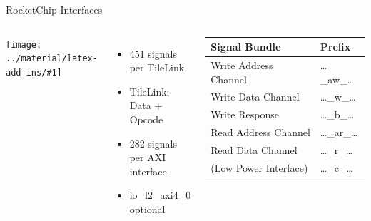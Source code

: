 \documentclass[]{beamer} %
\newcommand*{\COMPILEIMAGES}{}%
\newcommand\inputimage[1]{%
	\ifdefined\COMPILEIMAGES
		
	\else
		\texttt{[image: ../material/latex-add-ins/\#1]}
	\fi
	}
\newenvironment{fullpage}[0]{%
	\begin{list}{}{%
		\setlength{\leftmargin}{-7mm}%
		\setlength{\rightmargin}{-7mm}%
		\vspace*{-10pt}
		}%
\item[]}{\end{list}}
\begin{document}
\begin{frame}{RocketChip Interfaces}
	\begin{fullpage}
		\small
		\begin{columns}
			\inputimage{image2}
			\pause
			\begin{itemize}
				\item 451 signals per TileLink
				\item TileLink: Data + Opcode
				\item 282 signals per AXI interface
				\item io\_l2\_axi4\_0 optional
			\end{itemize}
			\vspace{5mm}
			\begin{tabular}{l|l}
				Signal Bundle & Prefix\\
				\hline
				Write Address Channel & \ldots\_aw\_\ldots \\
				Write Data Channel & \ldots\_w\_\ldots \\
				Write Response & \ldots\_b\_\ldots \\
				Read Address Channel & \ldots\_ar\_\ldots \\
				Read Data Channel & \ldots\_r\_\ldots \\
				(Low Power Interface) & \ldots\_c\_\ldots \\
			\end{tabular}
		\end{columns}
	\end{fullpage}
\end{frame}

%
%
\end{document}
